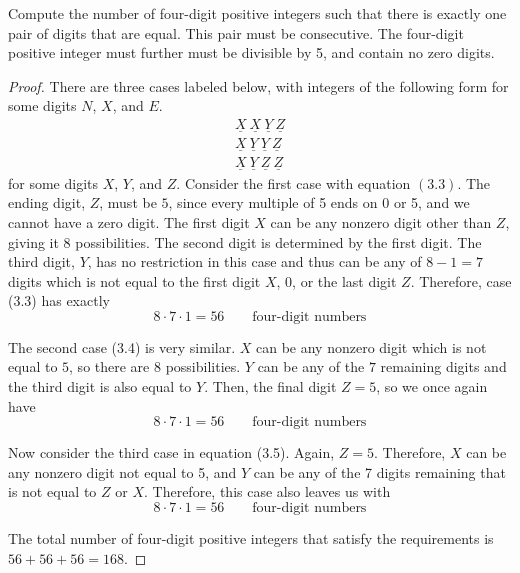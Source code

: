 \begin{example}
    Compute the number of four-digit positive integers such that there is exactly one pair of digits that are equal.  This pair must be consecutive. The four-digit positive integer must further must be divisible by 5, and contain no zero digits.
\end{example}
\begin{proof}
There are three cases labeled below, with integers of the following form for some digits $N$, $X$, and $E$. 
\begin{gather}
\underline{X} ~ \underline{X} ~ \underline{Y} ~ \underline{Z} \\
\underline{X} ~ \underline{Y} ~ \underline{Y} ~ \underline{Z} \\
\underline{X} ~ \underline{Y} ~ \underline{Z} ~ \underline{Z}
\end{gather}
\noindent for some digits $X$, $Y$, and $Z$. Consider the first case with equation $(3.3)$. The ending digit, $Z$, must be $5$, since every multiple of 5 ends on 0 or 5, and we cannot have a zero digit. The first digit $X$ can be any nonzero digit other than $Z$, giving it 8 possibilities. The second digit is determined by the first digit. The third digit, $Y$, has no restriction in this case and thus can be any of $8-1 = 7$ digits which is not equal to the first digit $X$, 0, or the last digit $Z$. Therefore, case (3.3) has exactly 
\[
8 \cdot 7 \cdot 1 = 56 \text{ ~~~~ four-digit numbers}
\]

The second case (3.4) is very similar. $X$ can be any nonzero digit which is not equal to $5$, so there are $8$ possibilities. $Y$ can be any of the $7$ remaining digits and the third digit is also equal to $Y$. Then, the final digit $Z = 5$, so we once again have 
\[
8 \cdot 7 \cdot 1 = 56 \text{ ~~~~ four-digit numbers}
\]

Now consider the third case in equation (3.5). Again, $Z = 5$. Therefore, $X$ can be any nonzero digit not equal to 5, and $Y$ can be any of the 7 digits remaining that is not equal to $Z$ or $X$. Therefore, this case also leaves us with
\[
8 \cdot 7 \cdot 1 = 56 \text{ ~~~~ four-digit numbers}
\]

The total number of four-digit positive integers that satisfy the requirements is $56 + 56 + 56 = 168$.

\end{proof}

